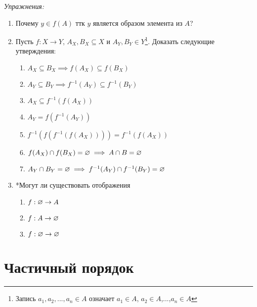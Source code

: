 
\vspace{1em}
{\it Упражнения:}
\begin{enumerate}
  \item{}Почему $y\in f(A)$ ттк $y$ является образом элемента из $A$?
  \item{}Пусть ${f:X\to Y}$, ${A_{X},B_{X}\subseteq X}$ и
  ${A_{Y},B_{Y}\in Y}$\footnote{Запись $a_1,a_2,...,a_{n}\in A$ означает
  $a_1\in A$, $a_2\in A$,...,$a_{n}\in A$}.
  Доказать следующие утверждения:
  \begin{fullwidth}
    \begin{multicols}{2}
      \begin{enumerate}
        \item{}$A_{X}\subseteq B_{X}\implies f(A_{X})\subseteq f(B_{X})$
        \item{}$A_{Y}\subseteq B_{Y}\implies f^{-1}(A_{Y})\subseteq f^{-1}(B_{Y})$
        \item{}$A_{X}\subseteq f^{-1}(f(A_{X}))$
        \item{}$A_{Y}=f(f^{-1}(A_{Y}))$
        \item{}$f^{-1}(f(f^{-1}(f(A_{X}))))=f^{-1}(f(A_{X}))$
        \item{}$f(A_{X})\cap f(B_{X})=\varnothing\implies A\cap B=\varnothing$
        \item{}$A_{Y}\cap B_{Y}=\varnothing\implies f^{-1}(A_{Y})\cap f^{-1}(B_{Y})=\varnothing$
      \end{enumerate}
    \end{multicols}
  \end{fullwidth}
  \item{}*Могут ли существовать отображения
  \begin{multicols}{3}
    \begin{enumerate}
      \item{}$f:\varnothing\to A$
      \item{}$f:A\to\varnothing$
      \item{}$f:\varnothing\to\varnothing$
    \end{enumerate}
  \end{multicols}
\end{enumerate}

\section{Частичный порядок}

